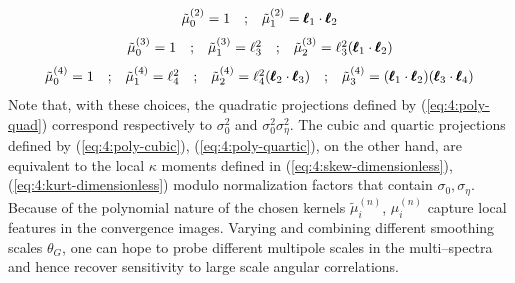 \begin{equation}
\label{eq:4:poly-quad}
\begin{matrix}
\tilde{\mu}^{(2)}_0 = 1 & ; & \tilde{\mu}^{(2)}_1 = \pmb{\ell}_1\cdot\pmb{\ell}_2 
\end{matrix}
\end{equation} 
%
\begin{equation}
\label{eq:4:poly-cubic}
\begin{matrix}
\tilde{\mu}^{(3)}_0 = 1 & ; & \tilde{\mu}^{(3)}_1 = \ell_3^2 & ; & \tilde{\mu}^{(3)}_2 = \ell_3^2 (\pmb{\ell}_1\cdot\pmb{\ell}_2)
\end{matrix}
\end{equation} 
%
\begin{equation}
\label{eq:4:poly-quartic}
\begin{matrix}
\tilde{\mu}^{(4)}_0 = 1 & ; & \tilde{\mu}^{(4)}_1 = \ell_4^2 & ; & \tilde{\mu}^{(4)}_2 = \ell_4^2 (\pmb{\ell}_2\cdot\pmb{\ell}_3) & ; & \tilde{\mu}^{(4)}_3 = (\pmb{\ell}_1\cdot\pmb{\ell}_2)(\pmb{\ell}_3\cdot\pmb{\ell}_4) 
\end{matrix}
\end{equation}
%
Note that, with these choices, the quadratic projections defined by (\ref{eq:4:poly-quad}) correspond respectively to $\sigma_0^2$ and $\sigma_0^2\sigma_\eta^2$. The cubic and quartic projections defined by (\ref{eq:4:poly-cubic}), (\ref{eq:4:poly-quartic}), on the other hand, are equivalent to the local $\kappa$ moments defined in (\ref{eq:4:skew-dimensionless}), (\ref{eq:4:kurt-dimensionless}) modulo normalization factors that contain $\sigma_0, \sigma_\eta$. Because of the polynomial nature of the chosen kernels $\tilde{\mu}^{(n)}_i$, $\mu^{(n)}_i$ capture local features in the convergence images. Varying and combining different smoothing scales $\theta_G$, one can hope to probe different multipole scales in the multi--spectra and hence recover sensitivity to large scale angular correlations.     

